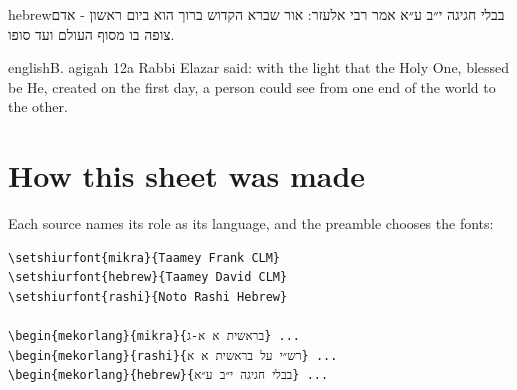 \documentclass[11pt]{article}
\begin{document}
\begin{mekor}
\begin{mekorlang}{hebrew}{בבלי חגיגה י״ב ע״א}
אמר רבי אלעזר: אור שברא הקדוש ברוך הוא ביום ראשון - אדם צופה בו מסוף העולם ועד סופו.
\end{mekorlang}
\begin{mekorlang}{english}{B. \Hdot agigah 12a}
Rabbi Elazar said: with the light that the Holy One, blessed be He, created on the first day,
a person could see from one end of the world to the other.
\end{mekorlang}
\end{mekor}

\section{How this sheet was made}

Each source names its role as its language, and the preamble chooses the fonts:

\begin{Verbatim}
\setshiurfont{mikra}{Taamey Frank CLM}
\setshiurfont{hebrew}{Taamey David CLM}
\setshiurfont{rashi}{Noto Rashi Hebrew}

\begin{mekorlang}{mikra}{בראשית א א-ג} ...
\begin{mekorlang}{rashi}{רש״י על בראשית א א} ...
\begin{mekorlang}{hebrew}{בבלי חגיגה י״ב ע״א} ...
\end{Verbatim}
\end{document}

